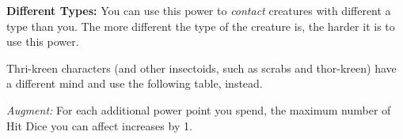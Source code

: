 {	\textbf{Different Types:} You can use this power to \emph{contact} creatures with different a type than you. The more different the type of the creature is, the harder it is to use this power.


	Thri-kreen characters (and other insectoids, such as scrabs and thor-kreen) have a different mind and use the following table, instead.


	\textit{Augment:} For each additional power point you spend, the maximum number of Hit Dice you can affect increases by 1.
}
